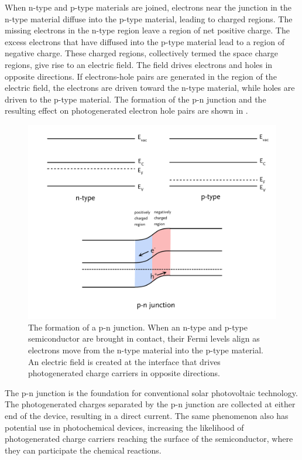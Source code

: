 When n-type and p-type materials are joined, electrons near the junction in the n-type
material diffuse into the p-type material, leading to charged regions. The missing
electrons in the n-type region leave a region of net positive charge. The excess electrons
that have diffused into the p-type material lead to a region of  negative charge. These
charged regions, collectively termed the space charge regions, give rise to an electric
field. The field drives electrons and holes in opposite directions. If electrons-hole
pairs are generated in the region of the electric field, the electrons are driven toward
the n-type material, while holes are driven to the p-type material. The formation of the
p-n junction and the resulting effect on photogenerated electron hole pairs are shown in
.

\begin{figure}
	\includegraphics[width=\textwidth]{pnjunction.pdf}
		\caption[The formation of a p-n junction]{%
			The formation of a p-n junction. When an n-type and p-type 
			semiconductor are brought in contact, their Fermi levels 
			align as electrons move from the n-type material into the 
			p-type material. An electric field is created at the 
			interface that drives photogenerated charge carriers in 
			opposite directions.}
	\label{fig:pnjunction}
\end{figure}

The p-n junction is the foundation for conventional solar photovoltaic technology. The
photogenerated charges separated by the p-n junction are collected at either end of the
device, resulting in a direct current. The same phenomenon also has potential use in
photochemical devices, increasing the likelihood of photogenerated charge carriers
reaching the surface of the semiconductor, where they can participate the chemical
reactions. 


